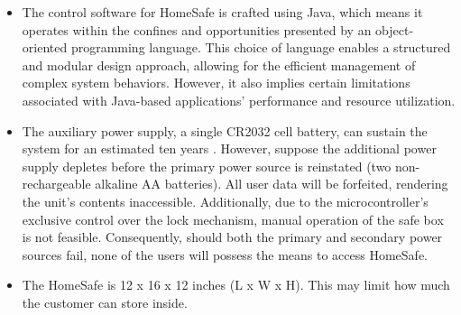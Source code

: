 \documentclass{article}
\begin{document}
\begin{itemize}
    \item The control software for HomeSafe is crafted using Java, which means it operates within the confines and opportunities presented by an object-oriented programming language. This choice of language enables a structured and modular design approach, allowing for the efficient management of complex system behaviors. However, it also implies certain limitations associated with Java-based applications' performance and resource utilization.
    \item The auxiliary power supply, a single CR2032 cell battery, can sustain the system for an estimated ten years \cite{microbatteryEverythingNeed}. However, suppose the additional power supply depletes before the primary power source is reinstated (two non-rechargeable alkaline AA batteries). All user data will be forfeited, rendering the unit's contents inaccessible. Additionally, due to the microcontroller's exclusive control over the lock mechanism, manual operation of the safe box is not feasible. Consequently, should both the primary and secondary power sources fail, none of the users will possess the means to access HomeSafe.
    \item The HomeSafe is 12 x 16 x 12 inches (L x W x H). This may limit how much the customer can store inside.
\end{itemize}

\newpage

\printbibliography

{\parindent0pt}
\end{document}
